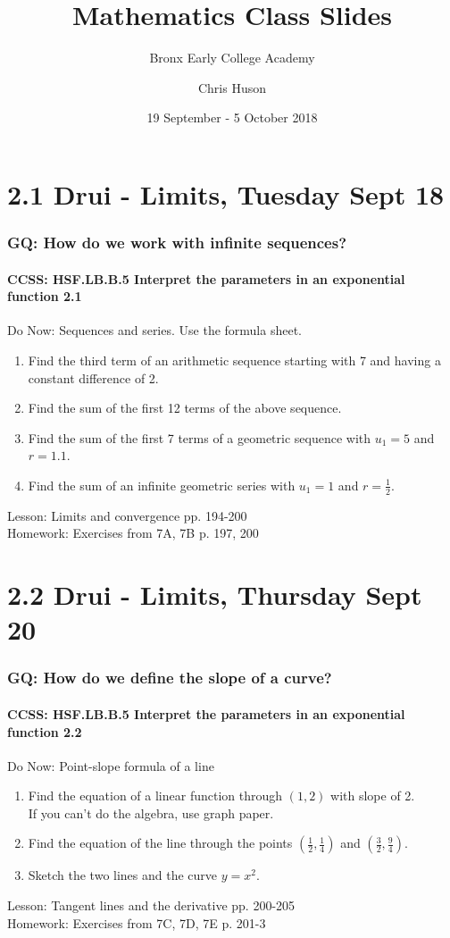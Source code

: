 \documentclass{beamer}
\title{Mathematics Class Slides}
\subtitle{Bronx Early College Academy}
\author{Chris Huson}
\date{19 September - 5 October 2018}
\begin{document}
\frame{\titlepage}


\section{2.1 Drui - Limits, Tuesday Sept 18}
  \frame
  {
    \frametitle{GQ: How do we work with infinite sequences?}
    \framesubtitle{CCSS: HSF.LB.B.5 Interpret the parameters in an exponential function  \alert{2.1}}

    \begin{block}{Do Now: Sequences and series. Use the formula sheet.}
      \begin{enumerate}
      \item Find the third term of an arithmetic sequence starting with 7 and having a constant difference of 2.
      \item Find the sum of the first 12 terms of the above sequence.
      \item Find the sum of the first 7 terms of a geometric sequence with $u_1=5$ and $r=1.1$.
      \item Find the sum of an infinite geometric series with $u_1=1$ and $r=\frac{1}{2}$.
      \end{enumerate}
   \end{block}
    Lesson: Limits and convergence pp. 194-200\\ \bigskip
    Homework: Exercises from 7A, 7B p. 197, 200
  }

  \section{2.2 Drui - Limits, Thursday Sept 20}
    \frame
    {
      \frametitle{GQ: How do we define the slope of a curve?}
      \framesubtitle{CCSS: HSF.LB.B.5 Interpret the parameters in an exponential function  \alert{2.2}}

      \begin{block}{Do Now: Point-slope formula of a line}
        \begin{enumerate}
        \item Find the equation of a linear function through $(1,2)$ with slope of 2.\\
        If you can't do the algebra, use graph paper.
        \item Find the equation of the line through the points $\displaystyle (\frac{1}{2}, \frac{1}{4})$ and $\displaystyle (\frac{3}{2}, \frac{9}{4})$.
        \item Sketch the two lines and the curve $y=x^2$.
        \end{enumerate}
     \end{block}
      Lesson: Tangent lines and the derivative pp. 200-205\\ \bigskip
      Homework: Exercises from 7C, 7D, 7E p. 201-3
    }
\end{document}
